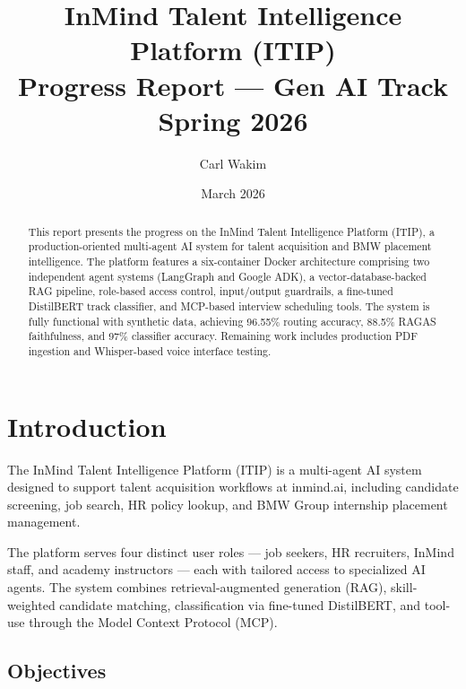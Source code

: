 \documentclass[12pt, a4paper]{article}
\title{
    \vspace{-1cm}
    {\LARGE\bfseries InMind Talent Intelligence Platform (ITIP)}\\[0.3cm]
    {\Large Progress Report — Gen AI Track}\\[0.2cm]
    {\large Spring 2026}
}
\author{Carl Wakim}
\date{March 2026}
\begin{document}
\maketitle
\thispagestyle{fancy}

\begin{abstract}
This report presents the progress on the InMind Talent Intelligence Platform (ITIP), a production-oriented multi-agent AI system for talent acquisition and BMW placement intelligence. The platform features a six-container Docker architecture comprising two independent agent systems (LangGraph and Google ADK), a vector-database-backed RAG pipeline, role-based access control, input/output guardrails, a fine-tuned DistilBERT track classifier, and MCP-based interview scheduling tools. The system is fully functional with synthetic data, achieving 96.55\% routing accuracy, 88.5\% RAGAS faithfulness, and 97\% classifier accuracy. Remaining work includes production PDF ingestion and Whisper-based voice interface testing.
\end{abstract}

\tableofcontents
\newpage

\section{Introduction}

The InMind Talent Intelligence Platform (ITIP) is a multi-agent AI system designed to support talent acquisition workflows at inmind.ai, including candidate screening, job search, HR policy lookup, and BMW Group internship placement management.

The platform serves four distinct user roles — job seekers, HR recruiters, InMind staff, and academy instructors — each with tailored access to specialized AI agents. The system combines retrieval-augmented generation (RAG), skill-weighted candidate matching, classification via fine-tuned DistilBERT, and tool-use through the Model Context Protocol (MCP).

\subsection{Objectives}
\end{document}
